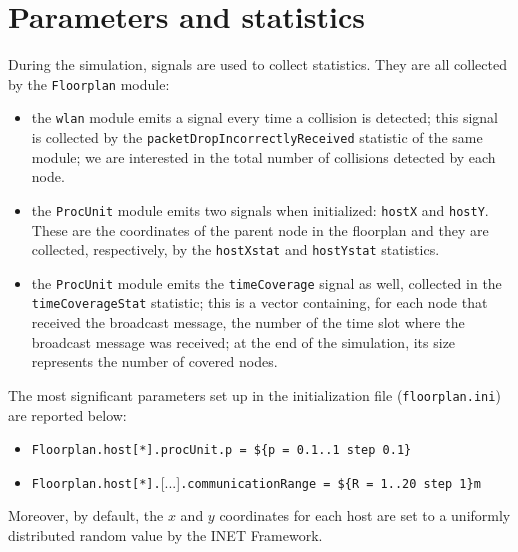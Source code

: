 \section{Parameters and statistics}
During the simulation, signals are used to collect statistics. They are all
collected by the \texttt{Floorplan} module:
\begin{itemize}
    \item the \texttt{wlan} module emits a signal every time a collision is
    detected; this signal is collected by the
    \texttt{packetDropIncorrectlyReceived} statistic of the same module; we are
    interested in the total number of collisions detected by each node.
    \item the \texttt{ProcUnit} module emits two signals when initialized:
    \texttt{hostX} and \texttt{hostY}. These are the coordinates of the parent
	node in the floorplan and they are collected, respectively, by the
    \texttt{hostXstat} and \texttt{hostYstat} statistics.
    \item the \texttt{ProcUnit} module emits the \texttt{timeCoverage} signal as
    well, collected in the \texttt{timeCoverageStat} statistic; this is a
    vector containing, for each node that received the broadcast message, the
    number of the time slot where the broadcast message was received; at
    the end of the simulation, its size represents the number of covered nodes.
\end{itemize}
The most significant parameters set up in the initialization file
(\texttt{floorplan.ini}) are reported below:
\begin{itemize}
    \item \texttt{Floorplan.host[*].procUnit.p = \$\{p = 0.1..1 step 0.1\}}
    \item \texttt{Floorplan.host[*].}[...]\texttt{.communicationRange = \$\{R = 1..20 step 1\}m}
\end{itemize}
Moreover, by default, the $x$ and $y$ coordinates for each host are set to a
uniformly distributed random value by the INET Framework.
